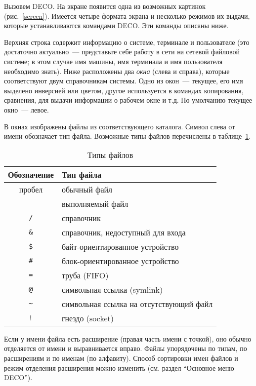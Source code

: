 Вызовем DECO. На экране появится одна из возможных
картинок (рис.~\ref{screen}). Имеется четыре формата экрана и несколько
режимов их выдачи, которые устанавливаются командами DECO. Эти
команды описаны ниже.

Верхняя строка содержит информацию о
системе, терминале и пользователе (это достаточно актуально~---
представьте себе работу в сети на сетевой файловой системе; в этом случае
имя машины, имя терминала и имя пользователя необходимо знать).
Ниже расположены два {\em окна} (слева и справа), которые соответствуют двум
справочникам системы. Одно из окон~--- текущее, его имя выделено
инверсией или цветом, другое используется в командах копирования,
сравнения, для выдачи информации о рабочем окне и т.д.
По умолчанию текущее окно~--- левое.

В окнах изображены файлы из соответствующего каталога.
Символ слева от имени обозначает тип файла. Возможные типы файлов
перечислены в таблице~\ref{filetypes}.

\begin{table}[bp]
\begin{center}
\begin{tabular}{|cl|}
\hline
Обозначение & Тип файла \\
\hline
пробел & обычный файл \\
{\tt *} & выполняемый файл \\
{\tt /} & справочник \\
{\tt \&} & справочник, недоступный для входа \\
{\tt \$} & байт-ориентированное устройство \\
{\tt \#} & блок-ориентированное устройство \\
{\tt =} & труба (FIFO) \\
{\tt @} & символьная ссылка (symlink) \\
{\tt \~{}} & символьная ссылка на отсутствующий файл \\
{\tt !} & гнездо (socket) \\
\hline
\end{tabular}
\caption{Типы файлов}
\label{filetypes}
\end{center}
\end{table}

Если у имени файла есть расширение (правая часть имени с точкой),
оно обычно отделяется от имени и выравнивается вправо.
Файлы упорядочены по типам, по расширениям и по именам (по алфавиту).
Способ сортировки имен файлов и режим отделения расширения можно
изменить (см. раздел ``Основное меню DECO'').

